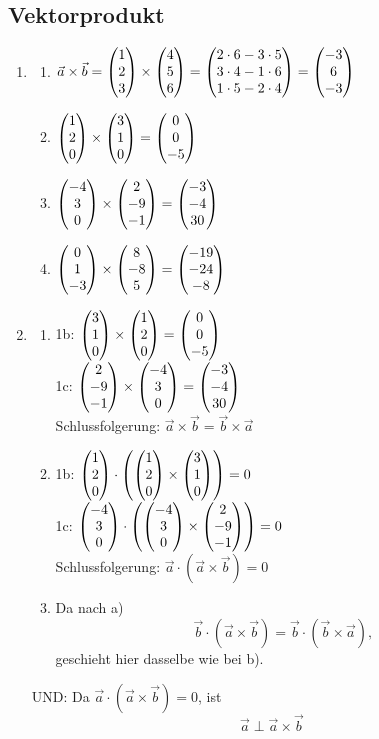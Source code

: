\subsection{Vektorprodukt}
	\begin{enumerate}
\item
	\begin{enumerate}
		\item $\vec{a} \times \vec{b} = \vektor{1}{2}{3}\times\vektor{4}{5}{6}=\vektor{2 \cdot 6 - 3 \cdot 5}{3 \cdot 4 - 1 \cdot 6}{1 \cdot 5 - 2 \cdot 4} =\vektor{-3}{6}{-3}$
		\item $\vektor{1}{2}{0}\times\vektor{3}{1}{0}=\vektor{0}{0}{-5}$
		\item $\vektor{-4}{3}{0}\times\vektor{2}{-9}{-1}=\vektor{-3}{-4}{30}$
		\item $\vektor{0}{1}{-3}\times\vektor{8}{-8}{5}= \vektor{-19}{-24}{-8}$
	\end{enumerate}

\item
	\begin{enumerate}
		\item 1b:	$\vektor{3}{1}{0}\times\vektor{1}{2}{0}=\vektor{0}{0}{-5}$\\
			  1c:	$\vektor{2}{-9}{-1}\times\vektor{-4}{3}{0}=\vektor{-3}{-4}{30}$\\
			  Schlussfolgerung: $\vec{a}\times\vec{b}=\vec{b}\times\vec{a}$\bigskip
		\item 1b:	$\vektor{1}{2}{0}\cdot\left(\vektor{1}{2}{0}\times\vektor{3}{1}{0}\right)=0$\\
			  1c:	$\vektor{-4}{3}{0}\cdot\left(\vektor{-4}{3}{0}\times\vektor{2}{-9}{-1}\right)=0$\\
			  Schlussfolgerung: $\vec{a}\cdot(\vec{a}\times\vec{b})=0$\bigskip
		\item Da nach a) $$\vec{b}\cdot(\vec{a}\times\vec{b})=\vec{b}\cdot(\vec{b}\times\vec{a}),$$ geschieht hier dasselbe wie bei b).\\		
	\end{enumerate}
	UND: Da $\vec{a}\cdot(\vec{a}\times\vec{b})=0$, ist $$\vec{a}\perp\vec{a}\times\vec{b}$$
	
\end{enumerate}
